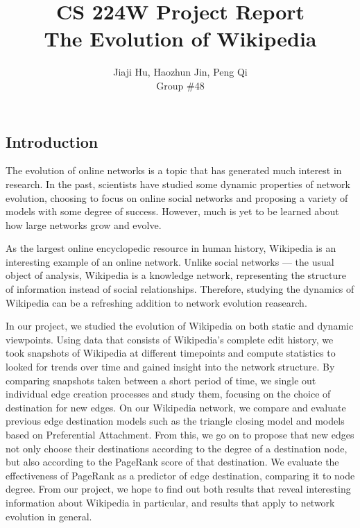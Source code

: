 \documentclass[10pt]{article}
\begin{document}
\title{CS 224W Project Report\\ The Evolution of Wikipedia}
\author{Jiaji Hu, Haozhun Jin, Peng Qi\\Group \#48}
\date{}
\maketitle

\begin{multicols}{2}
\section{Introduction}

The evolution of online networks is a topic that has generated much interest in research. In the past, scientists have studied some dynamic properties of network evolution, choosing to focus on online social networks and proposing a variety of models with some degree of success. However, much is yet to be learned about how large networks grow and evolve.

As the largest online encyclopedic resource in human history, Wikipedia is an interesting example of an online network. Unlike social networks --- the usual object of analysis, Wikipedia is a knowledge network, representing the structure of information instead of social relationships. Therefore, studying the dynamics of Wikipedia can be a refreshing addition to network evolution reasearch.

In our project, we studied the evolution of Wikipedia on both static and dynamic viewpoints. Using data that consists of Wikipedia's complete edit history, we took snapshots of Wikipedia at different timepoints and compute statistics to looked for trends over time and gained insight into the network structure. By comparing snapshots taken between a short period of time, we single out individual edge creation processes and study them, focusing on the choice of destination for new edges. On our Wikipedia network, we compare and evaluate previous edge destination models such as the triangle closing model and models based on Preferential Attachment. From this, we go on to propose that new edges not only choose their destinations according to the degree of a destination node, but also according to the PageRank score of that destination. We evaluate the effectiveness of PageRank as a predictor of edge destination, comparing it to node degree. From our project, we hope to find out both results that reveal interesting information about Wikipedia in particular, and results that apply to network evolution in general.


\end{multicols}
\end{document}
